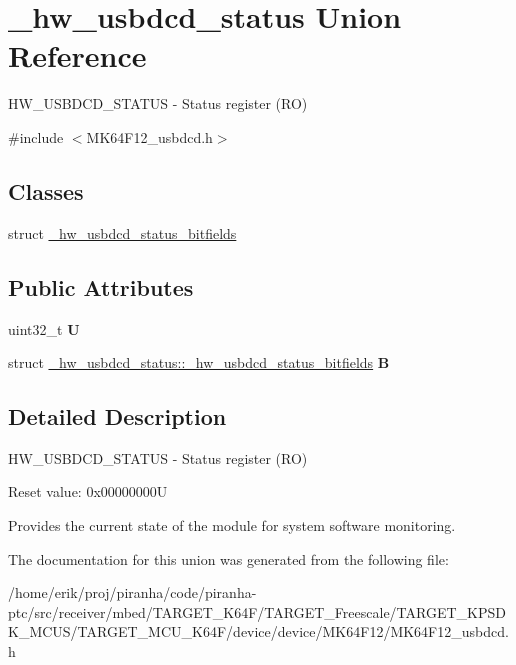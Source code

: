 \hypertarget{union__hw__usbdcd__status}{}\section{\+\_\+hw\+\_\+usbdcd\+\_\+status Union Reference}
\label{union__hw__usbdcd__status}


H\+W\+\_\+\+U\+S\+B\+D\+C\+D\+\_\+\+S\+T\+A\+T\+US -\/ Status register (RO)  




{\ttfamily \#include $<$M\+K64\+F12\+\_\+usbdcd.\+h$>$}

\subsection*{Classes}
\begin{DoxyCompactItemize}
\item 
struct \hyperlink{struct__hw__usbdcd__status_1_1__hw__usbdcd__status__bitfields}{\+\_\+hw\+\_\+usbdcd\+\_\+status\+\_\+bitfields}
\end{DoxyCompactItemize}
\subsection*{Public Attributes}
\begin{DoxyCompactItemize}
\item 
uint32\+\_\+t {\bfseries U}\hypertarget{union__hw__usbdcd__status_ac20e8590a77aa52acf312ba19193aba3}{}\label{union__hw__usbdcd__status_ac20e8590a77aa52acf312ba19193aba3}

\item 
struct \hyperlink{struct__hw__usbdcd__status_1_1__hw__usbdcd__status__bitfields}{\+\_\+hw\+\_\+usbdcd\+\_\+status\+::\+\_\+hw\+\_\+usbdcd\+\_\+status\+\_\+bitfields} {\bfseries B}\hypertarget{union__hw__usbdcd__status_a81edeaec30977c2178845efee1f54fbd}{}\label{union__hw__usbdcd__status_a81edeaec30977c2178845efee1f54fbd}

\end{DoxyCompactItemize}


\subsection{Detailed Description}
H\+W\+\_\+\+U\+S\+B\+D\+C\+D\+\_\+\+S\+T\+A\+T\+US -\/ Status register (RO) 

Reset value\+: 0x00000000U

Provides the current state of the module for system software monitoring. 

The documentation for this union was generated from the following file\+:\begin{DoxyCompactItemize}
\item 
/home/erik/proj/piranha/code/piranha-\/ptc/src/receiver/mbed/\+T\+A\+R\+G\+E\+T\+\_\+\+K64\+F/\+T\+A\+R\+G\+E\+T\+\_\+\+Freescale/\+T\+A\+R\+G\+E\+T\+\_\+\+K\+P\+S\+D\+K\+\_\+\+M\+C\+U\+S/\+T\+A\+R\+G\+E\+T\+\_\+\+M\+C\+U\+\_\+\+K64\+F/device/device/\+M\+K64\+F12/M\+K64\+F12\+\_\+usbdcd.\+h\end{DoxyCompactItemize}
